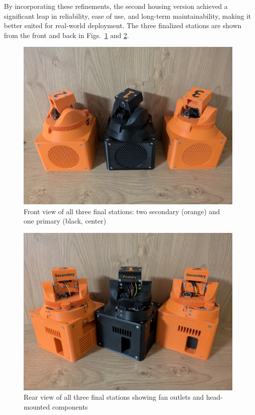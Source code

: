 By incorporating these refinements, the second housing version achieved a significant leap in reliability, ease of use, and long-term maintainability, making it better suited for real-world deployment. The three finalized stations are shown from the front and back in Figs.~\ref{fig:finalstationsfront} and \ref{fig:finalstationsback}.

\begin{figure}[H]
	\centering
	\includegraphics[width=1.0\linewidth]{figures/final_stations_front}
	\caption{Front view of all three final stations: two secondary (orange) and one primary (black, center)}
	\label{fig:finalstationsfront}
\end{figure}

\begin{figure}[H]
	\centering
	\includegraphics[width=1.0\linewidth]{figures/final_stations_back}
	\caption{Rear view of all three final stations showing fan outlets and head-mounted components}
	\label{fig:finalstationsback}
\end{figure}


